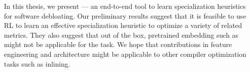 



In this thesis, we present \doccam --- an end-to-end tool to learn
specialization heuristics for software debloating. Our preliminary results
suggest that it is feasible to use RL to learn an effective specialization
heuristic to optimize a variety of related metrics. They also suggest that out
of the box, pretrained embedding such as \insttovec might not be applicable for the task.
%
%
We hope that \doccam contributions in feature engineering and architecture
might be applicable to other compiler optimization tasks such as inlining.

